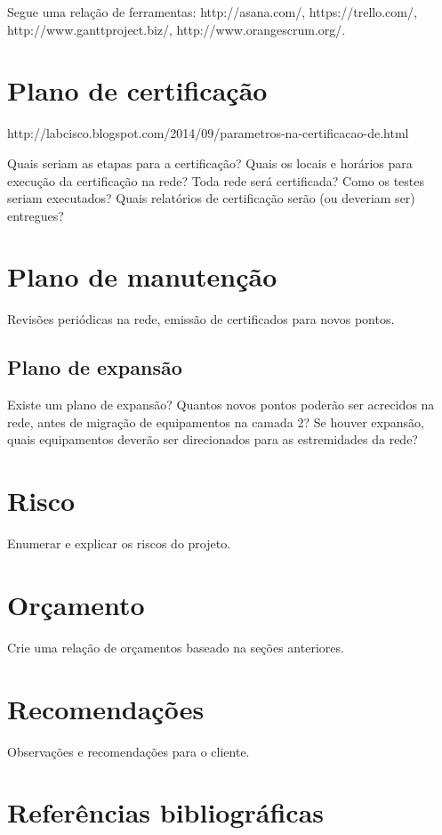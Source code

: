 \documentclass[	DIV=calc,%
							paper=a4,%
							fontsize=12pt,%
							onecolumn]{scrartcl}	 					%
\begin{document}
Segue uma relação de ferramentas:
http://asana.com/, 
https://trello.com/, 
http://www.ganttproject.biz/, 
http://www.orangescrum.org/. 

\section{Plano de certificação}
http://labcisco.blogspot.com/2014/09/parametros-na-certificacao-de.html

Quais seriam as etapas para a certificação? 
Quais os locais e horários para execução da certificação na rede? Toda rede será certificada?
Como os testes seriam executados?
Quais relatórios de certificação serão (ou deveriam ser) entregues? 

\section{Plano de manutenção}

Revisões periódicas na rede, emissão de certificados para novos pontos.

\subsection{Plano de expansão}
Existe um plano de expansão? Quantos novos pontos poderão ser acrecidos na rede, antes de migração de equipamentos na camada 2? Se houver expansão, quais equipamentos deverão ser direcionados para as estremidades da rede? 

\section{Risco}
Enumerar e explicar os riscos do projeto.

\section{Orçamento}
Crie uma relação de orçamentos baseado na seções anteriores.

\section{Recomendações}
Observações e recomendações para o cliente.

\section{Referências bibliográficas}
\renewcommand\refname{} %

  
\end{document}
